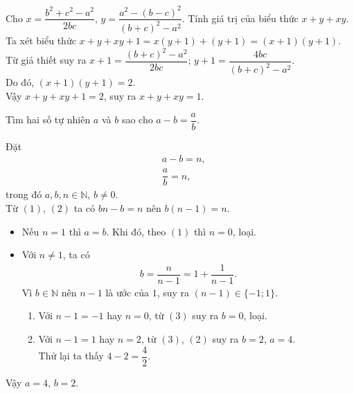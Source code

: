 \begin{bt}%
 Cho $x=\dfrac{b^2+c^2-a^2}{2bc}$, $y=\dfrac{a^2-(b-c)^2}{(b+c)^2-a^2}$. Tính giá trị của biểu thức $x+y+xy$.
 \loigiai
  {
  Ta xét biểu thức $x+y+xy+1 = x(y+1)+(y+1) = (x+1)(y+1)$.\\
  Từ giả thiết suy ra $x+1=\dfrac{(b+c)^2-a^2}{2bc}$; $y+1=\dfrac{4bc}{(b+c)^2-a^2}$.\\
  Do đó, $(x+1)(y+1)=2$.\\
  Vậy $x+y+xy+1=2$, suy ra $x+y+xy=1$.
  }
\end{bt}

\begin{bt}%
 Tìm hai số tự nhiên $a$ và $b$ sao cho $a-b=\dfrac{a}{b}$.
 \loigiai
  {
  Đặt
  {\allowdisplaybreaks
  \begin{align}
   & a-b=n, \tag{1}\\
   & \dfrac{a}{b}=n,\tag{2}
  \end{align}}
  trong đó $a,b,n\in\mathbb{N}$, $b\neq 0$.\\
  Từ $(1)$, $(2)$ ta có $bn-b=n$ nên $b(n-1)=n$.
  \begin{itemize}
   \item Nếu $n=1$ thì $a=b$. Khi đó, theo $(1)$ thì $n=0$, loại.
   \item Với $n\neq 1$, ta có
   \begin{align}
    b=\dfrac{n}{n-1} = 1+\dfrac{1}{n-1}.\tag{3}
   \end{align}
   Vì $b \in \mathbb{N}$ nên $n-1$ là ước của $1$, suy ra $(n-1)\in\{-1;1\}$.
   \begin{enumerate}[$\circ$]
   	\item Với $n-1=-1$ hay $n=0$, từ $(3)$ suy ra $b=0$, loại.
   	\item Với $n-1=1$ hay $n=2$, từ $(3)$, $(2)$ suy ra $b=2$, $a=4$.\\
   	Thử lại ta thấy $4-2=\dfrac{4}{2}$.
   \end{enumerate}
  \end{itemize}
  Vậy $a=4$, $b=2$.
  }
\end{bt}

